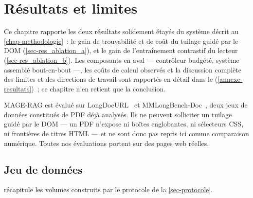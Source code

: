\chapter{Résultats et limites}
\label{chap-resultats}

Ce chapitre rapporte les deux résultats solidement étayés du système décrit au
\cref{chap-methodologie}~: le gain de trouvabilité et de coût du tuilage
guidé par le DOM (\cref{sec-res_ablation_a}), et le gain de l'entraînement
contrastif du lecteur (\cref{sec-res_ablation_b}). Les composants en aval ---
contrôleur budgété, système assemblé bout-en-bout ---, les coûts de calcul
observés et la discussion complète des limites et des directions de travail
sont rapportés en détail dans le 
(\cref{annexe-resultats})~; ce chapitre n'en retient que la conclusion.

MAGE-RAG est évalué sur LongDocURL~\citep{longdocurl2024} et
MMLongBench-Doc~\citep{mmlongbenchdoc2024}, deux jeux de données constitués de
PDF déjà analysés. Ils ne peuvent solliciter un tuilage guidé par le DOM ---
un PDF n'expose ni boîtes englobantes, ni sélecteurs CSS, ni frontières de
titres HTML --- et ne sont donc pas repris ici comme comparaison numérique.
Toutes nos évaluations portent sur des pages web réelles.

\section{Jeu de données}
\label{sec-res_donnees}

 récapitule les volumes construits par le protocole de la \cref{sec-protocole}.

